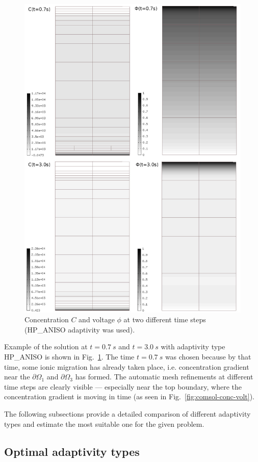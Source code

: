 \begin{figure}
  \begin{centering}
  \includegraphics[width=.75\columnwidth]{cphi}
  \caption{\label{fig:cphi} Concentration $C$
  and voltage $\phi$ at two different time steps
  (HP\_ANISO adaptivity was used).}
  \end{centering}
\end{figure}
Example of the solution at $t=0.7\ s$ and $t=3.0\ s$ 
with adaptivity type HP\_ANISO is shown
in Fig.~\ref{fig:cphi}. The time $t=0.7\ s$ was chosen because
by that time, some ionic migration has already taken place, i.e.
concentration gradient near the $\partial\Omega_1$ and
$\partial\Omega_3$ has formed. The automatic mesh refinements
at different time steps are clearly visible --- especially
near the top boundary, where the concentration gradient is
moving in time (as seen in Fig.~\ref{fig:comsol-conc-volt}).

The following subsections provide a detailed comparison of
different adaptivity types and estimate the most suitable
one for the given problem.

\subsection{Optimal adaptivity types}

